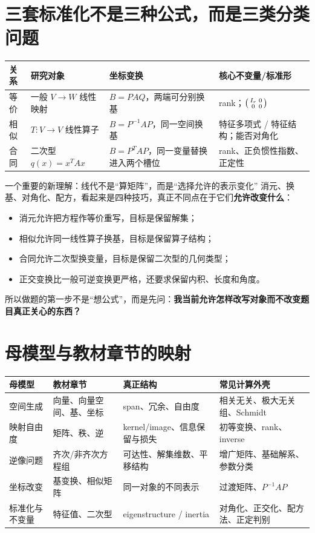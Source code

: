 \documentclass[11pt,a4paper,openany]{ctexbook}
\newcommand{\key}[1]{\textbf{\color{deep}#1}}
\begin{document}
\section{三套标准化不是三种公式，而是三类分类问题}
\begin{longtable}{L{2.4cm}L{3.6cm}L{3.6cm}L{\dimexpr\linewidth-10.17cm\relax}}
\toprule
\textbf{关系} & \textbf{研究对象} & \textbf{坐标变换} & \textbf{核心不变量/标准形}\\
\midrule
等价 & 一般 $V\to W$ 线性映射 & $B=PAQ$，两端可分别换基 & rank；$\begin{psmallmatrix}I_r&0\\0&0\end{psmallmatrix}$\\
相似 & $T:V\to V$ 线性算子 & $B=P^{-1}AP$，同一空间换基 & 特征多项式 / 特征结构；能否对角化\\
合同 & 二次型 $q(x)=x^TAx$ & $B=P^TAP$，同一变量替换进入两个槽位 & rank、正负惯性指数、正定性\\
\bottomrule
\end{longtable}

\begin{corebox}{一个重要的新理解：线代不是“算矩阵”，而是“选择允许的表示变化”}
消元、换基、对角化、配方，看起来是四种技巧，真正不同点在于它们\key{允许改变什么}：
\begin{itemize}
  \item 消元允许把方程作等价重写，目标是保留解集；
  \item 相似允许同一线性算子换基，目标是保留算子结构；
  \item 合同允许二次型换变量，目标是保留二次型的几何类型；
  \item 正交变换比一般可逆变换更严格，还要求保留内积、长度和角度。
\end{itemize}
所以做题的第一步不是“想公式”，而是先问：\key{我当前允许怎样改写对象而不改变题目真正关心的东西？}
\end{corebox}

\section{母模型与教材章节的映射}
\begin{longtable}{L{2.8cm}L{3.9cm}L{4.2cm}L{\dimexpr\linewidth-11.47cm\relax}}
\toprule
\textbf{母模型} & \textbf{教材章节} & \textbf{真正结构} & \textbf{常见计算外壳}\\
\midrule
空间生成 & 向量、向量空间、基、坐标 & span、冗余、自由度 & 相关无关、极大无关组、Schmidt\\
映射自由度 & 矩阵、秩、逆 & kernel/image、信息保留与损失 & 初等变换、rank、inverse\\
逆像问题 & 齐次/非齐次方程组 & 可达性、解集维数、平移结构 & 增广矩阵、基础解系、参数分类\\
坐标改变 & 基变换、相似矩阵 & 同一对象的不同表示 & 过渡矩阵、$P^{-1}AP$\\
标准化与不变量 & 特征值、二次型 & eigenstructure / inertia & 对角化、正交化、配方法、正定判别\\
\bottomrule
\end{longtable}
\end{document}
